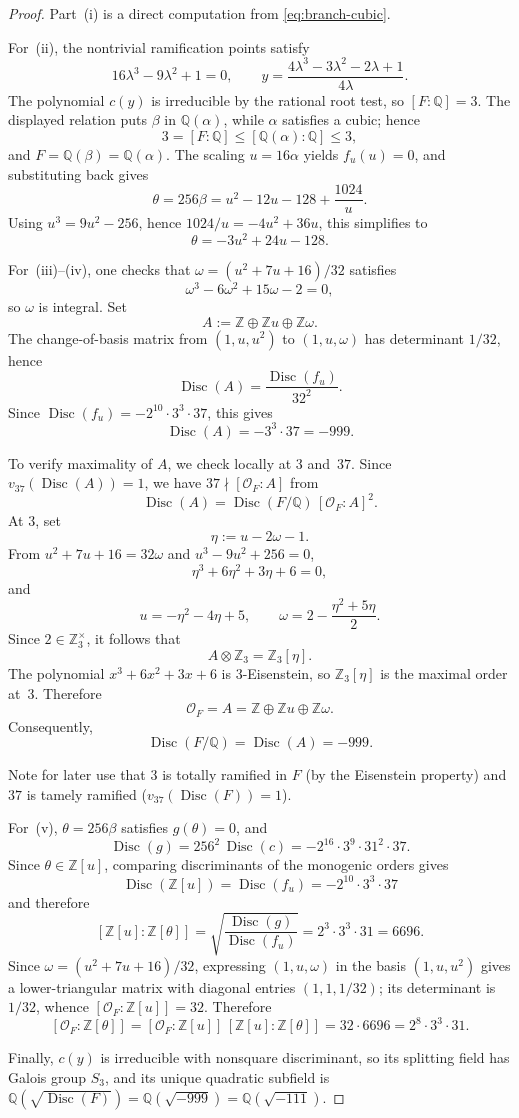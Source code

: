 \documentclass[11pt,letterpaper]{article}
\theoremstyle{plain}
\theoremstyle{remark}
\newcommand{\QQ}{\mathbb{Q}}
\newcommand{\ZZ}{\mathbb{Z}}
\newcommand{\Disc}{\operatorname{Disc}}
\begin{document}
\begin{proof}
Part~(i) is a direct computation from \eqref{eq:branch-cubic}.

For~(ii), the nontrivial ramification points satisfy
\[
16\lambda^3-9\lambda^2+1=0,
\qquad
y=\frac{4\lambda^3-3\lambda^2-2\lambda+1}{4\lambda}.
\]
The polynomial \(c(y)\) is irreducible by the rational root test, so \([F:\QQ]=3\). The displayed relation puts \(\beta\) in \(\QQ(\alpha)\), while \(\alpha\) satisfies a cubic; hence
\[
3=[F:\QQ]\leq[\QQ(\alpha):\QQ]\leq3,
\]
and \(F=\QQ(\beta)=\QQ(\alpha)\). The scaling \(u=16\alpha\) yields \(f_u(u)=0\), and substituting back gives
\[
\theta=256\beta=u^2-12u-128+\frac{1024}{u}.
\]
Using \(u^3=9u^2-256\), hence \(1024/u=-4u^2+36u\), this simplifies to
\[
\theta=-3u^2+24u-128.
\]

For~(iii)--(iv), one checks that \(\omega=(u^2+7u+16)/32\) satisfies
\[
\omega^3-6\omega^2+15\omega-2=0,
\]
so \(\omega\) is integral. Set
\[
A:=\ZZ\oplus \ZZ u\oplus \ZZ\omega.
\]
The change-of-basis matrix from \((1,u,u^2)\) to \((1,u,\omega)\) has determinant \(1/32\), hence
\[
\Disc(A)=\frac{\Disc(f_u)}{32^2}.
\]
Since \(\Disc(f_u)=-2^{10}\cdot 3^3\cdot 37\), this gives
\[
\Disc(A)=-3^3\cdot 37=-999.
\]

To verify maximality of \(A\), we check locally at \(3\) and~\(37\). Since \(v_{37}(\Disc(A))=1\), we have \(37\nmid [\mathcal O_F:A]\) from
\[
\Disc(A)=\Disc(F/\QQ)\,[\mathcal O_F:A]^2.
\]
At \(3\), set
\[
\eta:=u-2\omega-1.
\]
From \(u^2+7u+16=32\omega\) and \(u^3-9u^2+256=0\),
\[
\eta^3+6\eta^2+3\eta+6=0,
\]
and
\[
u=-\eta^2-4\eta+5,
\qquad
\omega=2-\frac{\eta^2+5\eta}{2}.
\]
Since \(2\in\ZZ_3^\times\), it follows that
\[
A\otimes \ZZ_3=\ZZ_3[\eta].
\]
The polynomial \(x^3+6x^2+3x+6\) is \(3\)-Eisenstein, so \(\ZZ_3[\eta]\) is the maximal order at~\(3\). Therefore
\[
\mathcal O_F=A=\ZZ\oplus \ZZ u\oplus \ZZ\omega.
\]
Consequently,
\[
\Disc(F/\QQ)=\Disc(A)=-999.
\]

Note for later use that \(3\) is totally ramified in \(F\) (by the Eisenstein property) and \(37\) is tamely ramified (\(v_{37}(\Disc(F))=1\)).

For~(v), \(\theta=256\beta\) satisfies \(g(\theta)=0\), and
\[
\Disc(g)=256^2\,\Disc(c)=-2^{16}\cdot 3^9\cdot 31^2\cdot 37.
\]
Since \(\theta\in \ZZ[u]\), comparing discriminants of the monogenic orders gives
\[
\Disc(\ZZ[u])=\Disc(f_u)=-2^{10}\cdot 3^3\cdot 37
\]
and therefore
\[
[\ZZ[u]:\ZZ[\theta]]
=\sqrt{\frac{\Disc(g)}{\Disc(f_u)}}
=2^3\cdot 3^3\cdot 31
=6696.
\]
Since \(\omega=(u^2+7u+16)/32\), expressing \((1,u,\omega)\) in the basis \((1,u,u^2)\) gives a lower-triangular matrix with diagonal entries \((1,1,1/32)\); its determinant is \(1/32\), whence \([\mathcal O_F:\ZZ[u]]=32\). Therefore
\[
[\mathcal O_F:\ZZ[\theta]]
=[\mathcal O_F:\ZZ[u]]\,[\ZZ[u]:\ZZ[\theta]]
=32\cdot 6696
=2^8\cdot 3^3\cdot 31.
\]

Finally, \(c(y)\) is irreducible with nonsquare discriminant, so its splitting field has Galois group \(S_3\), and its unique quadratic subfield is \(\QQ(\sqrt{\Disc(F)})=\QQ(\sqrt{-999})=\QQ(\sqrt{-111})\).
\end{proof}
\end{document}
